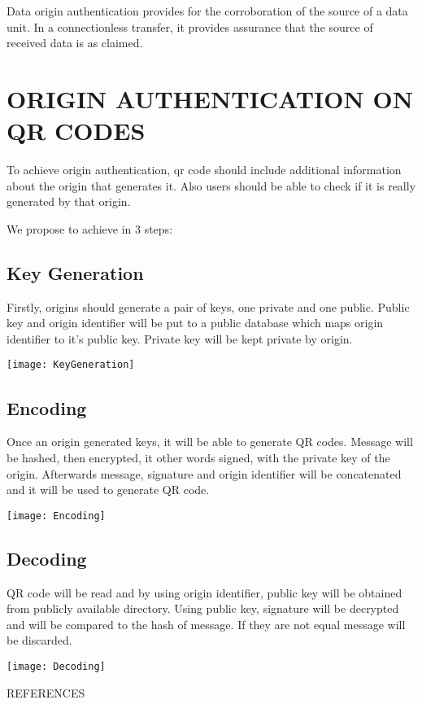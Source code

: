 \documentclass[12pt,journal,compsoc]{IEEEtran}
\begin{document}
Data origin authentication provides for the corroboration of the source
of a data unit. In a connectionless transfer, it provides assurance that
the source of received data is as claimed.


\section{ORIGIN AUTHENTICATION ON QR CODES}

To achieve origin authentication, qr code should include additional information about the origin that generates it. Also users should be able to check if it is really generated by that origin.

We propose to achieve in 3 steps: 


\subsection{Key Generation}

Firstly, origins should generate a pair of keys, one private and one public. Public key and origin identifier will be put to a public database which maps origin identifier to it's public key. Private key will be kept private by origin.


\begin{center}
\texttt{[image: KeyGeneration]}
\end{center}

\subsection{Encoding}

Once an origin generated keys, it will be able to generate QR codes. Message will be hashed, then encrypted, it other words signed, with the private key of the origin. Afterwards message, signature and origin identifier will be concatenated and it will be used to generate QR code.

\begin{center}
\texttt{[image: Encoding]}
\end{center}


\subsection{Decoding}

QR code will be read and by using origin identifier, public key will be obtained from publicly available directory. Using public key, signature will be decrypted and will be compared to the hash of message. If they are not equal message will be discarded. 


\begin{center}
\texttt{[image: Decoding]}
\end{center}


\begin{thebibliography}{1}

REFERENCES

\end{thebibliography}
\end{document}

